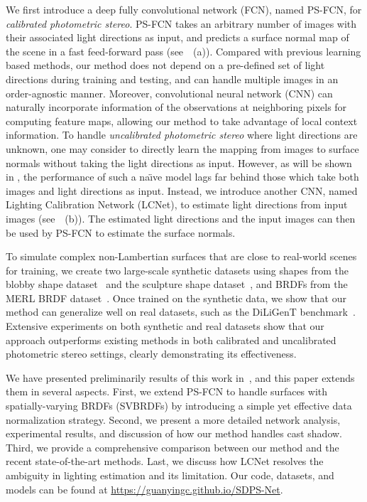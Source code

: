 \documentclass[10pt,journal,compsoc]{IEEEtran}
\newcommand{\rev}[1]{#1}
\begin{document}
We first introduce a deep fully convolutional network (FCN), named PS-FCN, for \emph{calibrated photometric stereo}. PS-FCN takes an arbitrary number of images with their associated light directions as input, and predicts a surface normal map of the scene in a fast feed-forward pass (see~~(a)). 
Compared with previous learning based methods, our method does not depend on a pre-defined set of light directions during training and testing, and can handle multiple images in an order-agnostic manner. 
Moreover, convolutional neural network (CNN) can naturally incorporate information of the observations at neighboring pixels for computing feature maps, allowing our method to take advantage of local context information. 
To handle \emph{uncalibrated photometric stereo} where light directions are unknown, one may consider to directly learn the mapping from images to surface normals without taking the light directions as input. However, as will be shown in , the performance of such a na\"{\i}ve model lags far behind those which take both images and light directions as input. 
Instead, we introduce another CNN, named Lighting Calibration Network (LCNet), to estimate light directions from input images (see~~(b)). The estimated light directions and the input images can then be used by PS-FCN to estimate the surface normals. 

To simulate complex non-Lambertian surfaces that are close to real-world scenes for training, we create two large-scale synthetic datasets using shapes from the blobby shape dataset~\cite{johnson2011shape} and the sculpture shape dataset~\cite{wiles2017silnet}, and BRDFs from the MERL BRDF dataset~\cite{matusik2003merl}. Once trained on the synthetic data, we show that our method can generalize well on real datasets, such as the DiLiGenT benchmark~\cite{shi2018benchmark}.
Extensive experiments on both synthetic and real datasets show that our approach outperforms existing methods in both calibrated and uncalibrated photometric stereo settings, clearly demonstrating its effectiveness.

We have presented preliminarily results of this work in~\cite{chen2018ps,chen2019SDPS_Net}, and this paper extends them in several aspects. First, we extend PS-FCN to handle surfaces with spatially-varying BRDFs (SVBRDFs) by introducing a simple yet effective data normalization strategy. Second, we present a more detailed network analysis, experimental results, and discussion of how our method handles cast shadow. Third, we provide a comprehensive comparison between our method and the recent state-of-the-art methods.
\rev{Last, we discuss how LCNet resolves the ambiguity in lighting estimation and its limitation.} 
Our code, datasets, and models can be found at \url{https://guanyingc.github.io/SDPS-Net}.
\end{document}

